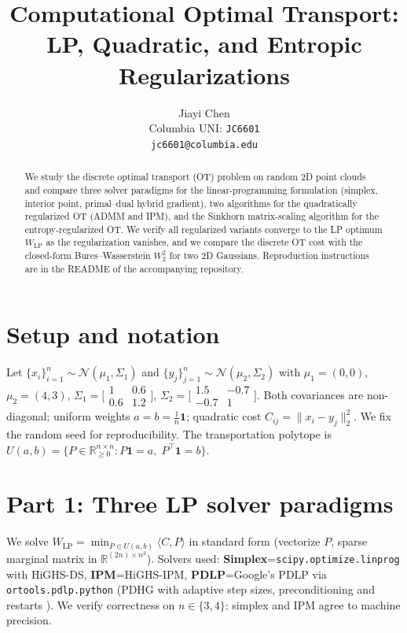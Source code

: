 \documentclass{article}
\title{Computational Optimal Transport: \\
  LP, Quadratic, and Entropic Regularizations}
\author{%
  Jiayi Chen \\
  Columbia UNI: \texttt{JC6601}\\
  \texttt{jc6601@columbia.edu}
}
\begin{document}
\maketitle

\begin{abstract}
We study the discrete optimal transport (OT) problem on random 2D point
clouds and compare three solver paradigms for the linear-programming
formulation (simplex, interior point, primal--dual hybrid gradient),
two algorithms for the quadratically regularized OT (ADMM and IPM), and
the Sinkhorn matrix-scaling algorithm for the entropy-regularized OT.
We verify all regularized variants converge to the LP optimum
$W_{\mathrm{LP}}$ as the regularization vanishes, and we compare the
discrete OT cost with the closed-form Bures--Wasserstein
$W_2^2$ for two 2D Gaussians.  Reproduction instructions are in the
README of the accompanying repository.
\end{abstract}

\section{Setup and notation}
\label{sec:setup}

Let $\{x_i\}_{i=1}^n \!\sim\! \mathcal N(\mu_1,\Sigma_1)$ and
$\{y_j\}_{j=1}^n \!\sim\! \mathcal N(\mu_2,\Sigma_2)$ with
$\mu_1\!=\!(0,0)$, $\mu_2\!=\!(4,3)$,
$\Sigma_1\!=\!\bigl[\!\begin{smallmatrix}1&0.6\\0.6&1.2\end{smallmatrix}\!\bigr]$,
$\Sigma_2\!=\!\bigl[\!\begin{smallmatrix}1.5&-0.7\\-0.7&1\end{smallmatrix}\!\bigr]$.
Both covariances are non-diagonal; uniform weights $a=b=\tfrac1n\mathbf 1$;
quadratic cost $C_{ij}=\|x_i-y_j\|_2^2$.  We fix the random seed for
reproducibility.  The transportation polytope is
$U(a,b)=\{P\!\in\!\mathbb R_{\ge 0}^{n\times n}\!:\!P\mathbf 1\!=\!a,\;
P^{\!\top}\!\mathbf 1\!=\!b\}$.

\section{Part 1: Three LP solver paradigms}
\label{sec:part1}

We solve $W_{\mathrm{LP}} = \min_{P\in U(a,b)}\langle C, P\rangle$ in
standard form (vectorize $P$, sparse marginal matrix in
$\mathbb R^{(2n)\times n^2}$).  Solvers used:
\textbf{Simplex}=\texttt{scipy.optimize.linprog} with HiGHS-DS,
\textbf{IPM}=HiGHS-IPM, \textbf{PDLP}=Google's PDLP via
\texttt{ortools.pdlp.python} (PDHG with adaptive step sizes,
preconditioning and restarts \cite{applegate2021pdlp,chambolle2011first}).
We verify correctness on $n\!\in\!\{3,4\}$: simplex and IPM agree to
machine precision.
\end{document}
